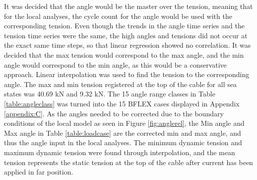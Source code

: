 \noindent It was decided that the angle would be the master over the tension, meaning that for the local analyses, the cycle count for the angle would be used with the corresponding tension. Even though the trends in the angle time series and the tension time series were the same, the high angles and tensions did not occur at the exact same time steps, so that linear regression showed no correlation. It was decided that the max tension would correspond to the max angle, and the min angle would correspond to the min angle, as this would be a conservative approach.  Linear interpolation was used to find the tension to the corresponding angle. The max and min tension registered at the top of the cable for all sea states was 40.69 kN and 9.32 kN. \newline
\newline
\noindent The 15 angle range classes in Table \ref{table:angleclass} was turned into the 15 BFLEX cases displayed in Appendix \ref{appendix:C}. As the angles needed to be corrected due to the boundary conditions of the local model as seen in Figure \ref{fig:anglerel}, the Min angle and Max angle in Table \ref{table:loadcase} are the corrected min and max angle, and thus the angle input in the local analyses. The minimum dynamic tension and maximum dynamic tension were found through interpolation, and the mean tension represents the static tension at the top of the cable after current has been applied in far position. 






